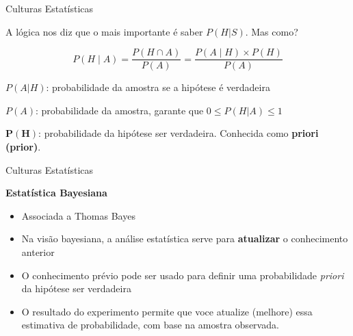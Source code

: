 \documentclass{beamer}\usepackage[]{graphicx}\usepackage[]{color}
\begin{document}
\begin{frame}{Culturas Estatísticas}

A lógica nos diz que o mais importante é saber $P(H|S)$. Mas como? \pause


\begin{equation*}
P(H \mid A) = \frac{P(H \cap A)}{P(A)} =\frac{P(A \mid H) \times P(H)}{P(A)}
\end{equation*}

$P(A | H)$: probabilidade da amostra se a hipótese é verdadeira

$P(A)$: probabilidade da amostra, garante que $0 \leq P(H | A) \leq 1$

$\mathbf{P(H)}$: probabilidade da hipótese ser verdadeira. Conhecida como \textbf{priori (prior)}.



\end{frame}

\begin{frame}{Culturas Estatísticas}

\textbf{Estatística Bayesiana}

\begin{itemize}

  \item Associada a Thomas Bayes

 \item Na visão bayesiana, a análise estatística serve para \textbf{atualizar} o conhecimento anterior

 \item O conhecimento prévio pode ser usado para definir uma probabilidade \emph{priori} da hipótese ser verdadeira 
 
 \item O resultado do experimento permite que voce atualize (melhore) essa estimativa de probabilidade, com base na amostra observada.

\end{itemize}

\end{frame}
\end{document}
